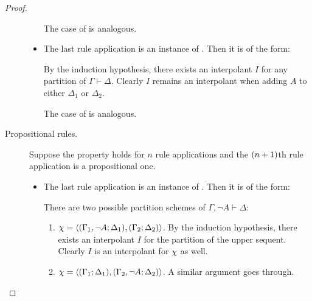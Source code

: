 \begin{proof}
\begin{description}
\begin{itemize}
\begin{enumerate}
					\end{enumerate}

					The case of  is analogous.

				\item The last rule application is an instance of . Then it is of the form:
					\begin{prooftree}
						\Axiomm{\Gamma \fCenter \Delta}
					\end{prooftree}

					By the induction hypothesis, there exists an interpolant $I$ for any partition  of $\Gamma \vdash \Delta$.
					Clearly $I$ remains an interpolant when adding $A$ to either $\Delta_1$ or $\Delta_2$.

					The case of  is analogous.

			\end{itemize}

		\item[\normalfont Propositional rules.]
			Suppose the property holds for $n$ rule applications and the $(n+\nolinebreak 1)$th rule application is a propositional one.

			\begin{itemize}
				\item The last rule application is an instance of . Then it is of the form:
					\begin{prooftree}
						\Axiomm{\Gamma \fCenter \Delta,  A}
						\RightLabelm{\lkrule{\lnot}{l}}
						\UnaryInfm{\lnot A, \Gamma \fCenter \Delta }
					\end{prooftree}

					There are two possible partition schemes of $\Gamma, \lnot A \vdash \Delta$:
					\begin{enumerate}
						\item $\chi =  \langle (\Gamma_1, \lnot A; \Delta_1), (\Gamma_2; \Delta_2)\rangle $.
							By the induction hypothesis, there exists an interpolant $I$ for the partition  of the upper sequent.
							Clearly $I$ is an interpolant for $\chi$ as well.

						\item $\chi =  \langle (\Gamma_1; \Delta_1), (\Gamma_2, \lnot A; \Delta_2)\rangle $. A similar argument goes through. 
					\end{enumerate}


\end{itemize}
\end{description}
\end{proof}
